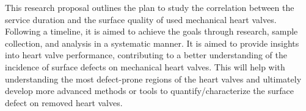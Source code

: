 This research proposal outlines the plan to study the correlation between the service duration and the surface quality of used mechanical heart valves. Following a timeline, it is aimed to achieve the goals through research, sample collection, and analysis in a systematic manner. It is aimed to provide insights into heart valve performance, contributing to a better understanding of the incidence of surface defects on mechanical heart valves. This will help with understanding the most defect-prone regions of the heart valves and ultimately develop more advanced methods or tools to quantify/characterize the surface defect on removed heart valves.

